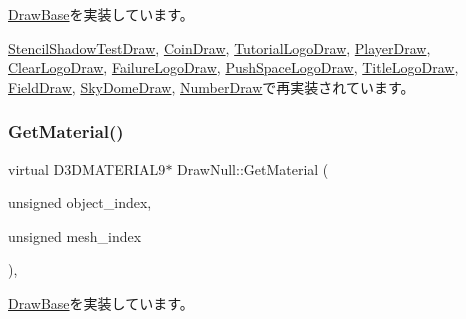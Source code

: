 \mbox{\hyperlink{class_draw_base_a4e36184dbb605bcae13bfb38722ddc24}{Draw\+Base}}を実装しています。



\mbox{\hyperlink{class_stencil_shadow_test_draw_a387a97781f743aa0ea0727c050ef53b2}{Stencil\+Shadow\+Test\+Draw}}, \mbox{\hyperlink{class_coin_draw_a1d4ab1a5c480833b8d8e7fe226136ad5}{Coin\+Draw}}, \mbox{\hyperlink{class_tutorial_logo_draw_ad9df98aa8a5b11872dba6f6609589035}{Tutorial\+Logo\+Draw}}, \mbox{\hyperlink{class_player_draw_a6cecfb28942044efff0b9d6213b511a5}{Player\+Draw}}, \mbox{\hyperlink{class_clear_logo_draw_a04ae25ae9cb59df0d0c346b65baed3f2}{Clear\+Logo\+Draw}}, \mbox{\hyperlink{class_failure_logo_draw_a2a74fafba17b2f63b1c61abd67289afd}{Failure\+Logo\+Draw}}, \mbox{\hyperlink{class_push_space_logo_draw_a4990a9f5662af324f2632e8647cbdde4}{Push\+Space\+Logo\+Draw}}, \mbox{\hyperlink{class_title_logo_draw_ab727012424a02249a90a0f7d247371a8}{Title\+Logo\+Draw}}, \mbox{\hyperlink{class_field_draw_a67eabcc5ffd6697b87e89a1c4ddb95f6}{Field\+Draw}}, \mbox{\hyperlink{class_sky_dome_draw_a1d708782f13648724e423d1dca22b213}{Sky\+Dome\+Draw}}, \mbox{\hyperlink{class_number_draw_ad1d9a4cee49e7bddce51b5c58e739de9}{Number\+Draw}}で再実装されています。

\mbox{\label{class_draw_null_a84969d22d3436986f214e9896fe44fc6}} 
\subsubsection{\texorpdfstring{Get\+Material()}{GetMaterial()}}
{\footnotesize\ttfamily virtual D3\+D\+M\+A\+T\+E\+R\+I\+A\+L9$\ast$ Draw\+Null\+::\+Get\+Material (\begin{DoxyParamCaption}\item[{unsigned}]{object\+\_\+index,  }\item[{unsigned}]{mesh\+\_\+index }\end{DoxyParamCaption})\hspace{0.3cm}{\ttfamily [inline]}, {\ttfamily [virtual]}}



\mbox{\hyperlink{class_draw_base_ad82a75dff8e4e2f2ebbec2dd0d0734e5}{Draw\+Base}}を実装しています。



